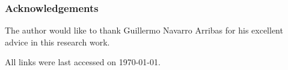 \documentclass[runningheads,a4paper]{llncs}
\begin{document}








\subsubsection*{Acknowledgements}

The author would like to thank Guillermo Navarro Arribas for his excellent advice in this research work.





All links were last accessed on \today.


\end{document}

